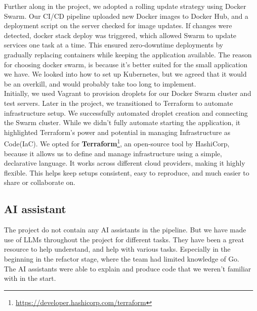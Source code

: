 Further along in the project, we adopted a rolling update strategy using Docker Swarm. Our CI/CD pipeline uploaded new Docker images to Docker Hub, and a deployment script on the server checked for image updates. If changes were detected, docker stack deploy was triggered, which allowed Swarm to update services one task at a time. This ensured zero-downtime deployments by gradually replacing containers while keeping the application available. The reason for choosing docker swarm, is because it's better suited for the small application we have. We looked into how to set up Kubernetes, but we agreed that it would be an overkill, and would probably take too long to implement.
\\

Initially, we used Vagrant to provision droplets for our Docker Swarm cluster and test servers. Later in the project, we transitioned to Terraform to automate infrastructure setup. We successfully automated droplet creation and connecting the Swarm cluster. While we didn’t fully automate starting the application, it highlighted Terraform’s power and potential in managing Infrastructure as Code(IaC). We opted for \textbf{Terraform}\footnote{\url{https://developer.hashicorp.com/terraform}}, an open-source tool by HashiCorp, because it allows us to define and manage infrastructure using a simple, declarative language. It works across different cloud providers, making it highly flexible. This helps keep setups consistent, easy to reproduce, and much easier to share or collaborate on.

\subsection{AI assistant} 

The project do not contain any AI assistants in the pipeline. But we have made use of LLMs throughout the project for different tasks. They have been a great resource to help understand, and help with various tasks. Especially in the beginning in the refactor stage, where the team had limited knowledge of Go. The AI assistants were able to explain and produce code that we weren't familiar with in the start.
